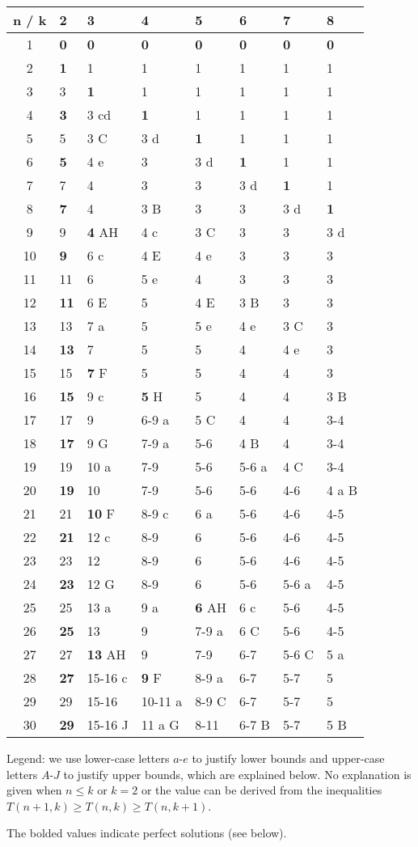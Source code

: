 \documentclass[a4paper]{article}
\begin{document}
\begin{tabular}{@{}clllllll@{}}
\hline
n / k & 2 & 3 & 4 & 5 & 6 & 7 & 8\tabularnewline
\hline
1 & \textbf{0} & \textbf{0} & \textbf{0} & \textbf{0} & \textbf{0} &
\textbf{0} & \textbf{0}\tabularnewline
2 & \textbf{1} & 1 & 1 & 1 & 1 & 1 & 1\tabularnewline
3 & 3 & \textbf{1} & 1 & 1 & 1 & 1 & 1\tabularnewline
4 & \textbf{3} & 3 cd & \textbf{1} & 1 & 1 & 1 & 1\tabularnewline
5 & 5 & 3 C & 3 d & \textbf{1} & 1 & 1 & 1\tabularnewline
6 & \textbf{5} & 4 e & 3 & 3 d & \textbf{1} & 1 & 1\tabularnewline
7 & 7 & 4 & 3 & 3 & 3 d & \textbf{1} & 1\tabularnewline
8 & \textbf{7} & 4 & 3 B & 3 & 3 & 3 d & \textbf{1}\tabularnewline
9 & 9 & \textbf{4} AH & 4 c & 3 C & 3 & 3 & 3 d\tabularnewline
10 & \textbf{9} & 6 c & 4 E & 4 e & 3 & 3 & 3\tabularnewline
11 & 11 & 6 & 5 e & 4 & 3 & 3 & 3\tabularnewline
12 & \textbf{11} & 6 E & 5 & 4 E & 3 B & 3 & 3\tabularnewline
13 & 13 & 7 a & 5 & 5 e & 4 e & 3 C & 3\tabularnewline
14 & \textbf{13} & 7 & 5 & 5 & 4 & 4 e & 3\tabularnewline
15 & 15 & \textbf{7} F & 5 & 5 & 4 & 4 & 3\tabularnewline
16 & \textbf{15} & 9 c & \textbf{5} H & 5 & 4 & 4 & 3 B\tabularnewline
17 & 17 & 9 & 6-9 a & 5 C & 4 & 4 & 3-4\tabularnewline
18 & \textbf{17} & 9 G & 7-9 a & 5-6 & 4 B & 4 & 3-4\tabularnewline
19 & 19 & 10 a & 7-9 & 5-6 & 5-6 a & 4 C & 3-4\tabularnewline
20 & \textbf{19} & 10 & 7-9 & 5-6 & 5-6 & 4-6 & 4 a B\tabularnewline
21 & 21 & \textbf{10} F & 8-9 c & 6 a & 5-6 & 4-6 & 4-5\tabularnewline
22 & \textbf{21} & 12 c & 8-9 & 6 & 5-6 & 4-6 & 4-5\tabularnewline
23 & 23 & 12 & 8-9 & 6 & 5-6 & 4-6 & 4-5\tabularnewline
24 & \textbf{23} & 12 G & 8-9 & 6 & 5-6 & 5-6 a & 4-5\tabularnewline
25 & 25 & 13 a & 9 a & \textbf{6} AH & 6 c & 5-6 & 4-5\tabularnewline
26 & \textbf{25} & 13 & 9 & 7-9 a & 6 C & 5-6 & 4-5\tabularnewline
27 & 27 & \textbf{13} AH & 9 & 7-9 & 6-7 & 5-6 C & 5 a\tabularnewline
28 & \textbf{27} & 15-16 c & \textbf{9} F & 8-9 a & 6-7 & 5-7 &
5\tabularnewline
29 & 29 & 15-16 & 10-11 a & 8-9 C & 6-7 & 5-7 & 5\tabularnewline
30 & \textbf{29} & 15-16 J & 11 a G & 8-11 & 6-7 B & 5-7 & 5
B\tabularnewline
\hline
\end{tabular}

Legend: we use lower-case letters $a$-$e$ to justify lower
bounds and upper-case letters $A$-$J$ to justify upper
bounds, which are explained below. No explanation is given when
$n\leq k$ or $k=2$ or the value can be derived from
the inequalities $T(n+1,k)\geq T(n,k)\geq T(n,k+1)$.

The bolded values indicate perfect solutions (see below).
\end{document}

